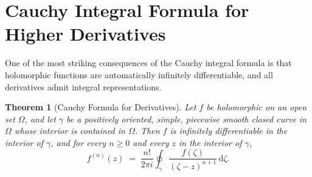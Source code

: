 \documentclass[12pt,a4paper,openany]{book}
\theoremstyle{definition}
\theoremstyle{plain}
\newtheorem{theorem}[definition]{Theorem}
\theoremstyle{remark}
\newcommand{\dd}{\mathrm{d}}
\begin{document}
\section{Cauchy Integral Formula for Higher Derivatives}
\label{sec:higher-derivatives}

One of the most striking consequences of the Cauchy integral formula is that
holomorphic functions are automatically infinitely differentiable, and all
derivatives admit integral representations.

\begin{theorem}[Cauchy Formula for Derivatives]\label{thm:cauchy-formula-derivatives}
Let $f$ be holomorphic on an open set $\Omega$, and let $\gamma$ be a positively
oriented, simple, piecewise smooth closed curve in $\Omega$ whose interior is
contained in $\Omega$. Then $f$ is infinitely differentiable in the interior
of $\gamma$, and for every $n\ge 0$ and every $z$ in the interior of $\gamma$,
\begin{equation}\label{eq:cauchy-derivative}
  f^{(n)}(z) \;=\; \frac{n!}{2\pi i}\oint_\gamma
    \frac{f(\zeta)}{(\zeta-z)^{n+1}}\,\dd\zeta.
\end{equation}
\end{theorem}
\end{document}
